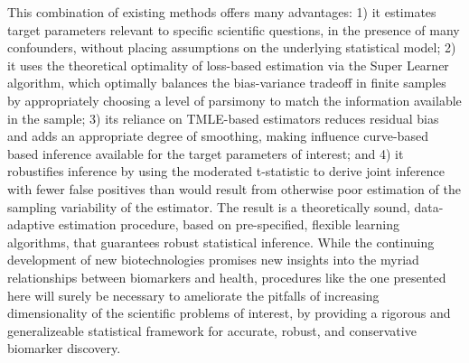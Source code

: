 This combination of existing methods offers many advantages: 1) it estimates
target parameters relevant to specific scientific questions, in the presence of
many confounders, without placing assumptions on the underlying statistical
model; 2) it uses the theoretical optimality of loss-based estimation via the
Super Learner algorithm, which optimally balances the bias-variance tradeoff in
finite samples by appropriately choosing a level of parsimony to match the
information available in the sample; 3) its reliance on TMLE-based estimators
reduces residual bias and adds an appropriate degree of smoothing, making
influence curve-based based inference available for the target parameters of
interest; and 4) it robustifies inference by using the moderated t-statistic to
derive joint inference with fewer false positives than would result from
otherwise poor estimation of the sampling variability of the estimator. The
result is a theoretically sound, data-adaptive estimation procedure, based on
pre-specified, flexible learning algorithms, that guarantees robust statistical
inference. While the continuing development of new biotechnologies promises new
insights into the myriad relationships between biomarkers and health,
procedures like the one presented here will surely be necessary to ameliorate
the pitfalls of increasing dimensionality of the scientific problems of
interest, by providing a rigorous and generalizeable statistical framework for
accurate, robust, and conservative biomarker discovery.


